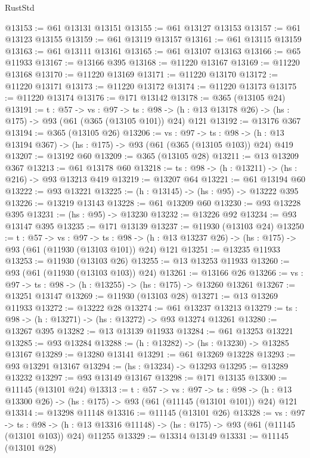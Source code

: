 \begin{lexlean}{RustStd}
\begin{coremodule}
@13153 := @61 @13131 @13151
@13155 := @61 @13127 @13153
@13157 := @61 @13123 @13155
@13159 := @61 @13119 @13157
@13161 := @61 @13115 @13159
@13163 := @61 @13111 @13161
@13165 := @61 @13107 @13163
@13166 := @65 @11933
@13167 := @13166 @395
@13168 := @11220 @13167
@13169 := @11220 @13168
@13170 := @11220 @13169
@13171 := @11220 @13170
@13172 := @11220 @13171
@13173 := @11220 @13172
@13174 := @11220 @13173
@13175 := @11220 @13174
@13176 := @171 @13142
@13178 := @365 (@13105 @24)
@13191 := {t : @57} ->
  {vs : @97} ->
  {ts : @98} -> (h : @13 @13178 @26) -> (hs : @175) -> @93 (@61 (@365 (@13105 @101)) @24) @121
@13192 := @13176 @367
@13194 := @365 (@13105 @26)
@13206 := {vs : @97} ->
  {ts : @98} -> (h : @13 @13194 @367) -> (hs : @175) -> @93 (@61 (@365 (@13105 @103)) @24) @419
@13207 := @13192 @60
@13209 := @365 (@13105 @28)
@13211 := @13 @13209 @367
@13213 := @61 @13178 @60
@13218 := {ts : @98} -> (h : @13211) -> (hs : @216) -> @93 @13213 @419
@13219 := @13207 @64
@13221 := @61 @13194 @60
@13222 := @93 @13221
@13225 := (h : @13145) -> (hs : @95) -> @13222 @395
@13226 := @13219 @13143
@13228 := @61 @13209 @60
@13230 := @93 @13228 @395
@13231 := (hs : @95) -> @13230
@13232 := @13226 @92
@13234 := @93 @13147 @395
@13235 := @171 @13139
@13237 := @11930 (@13103 @24)
@13250 := {t : @57} ->
  {vs : @97} ->
  {ts : @98} -> (h : @13 @13237 @26) -> (hs : @175) -> @93 (@61 (@11930 (@13103 @101)) @24) @121
@13251 := @13235 @11933
@13253 := @11930 (@13103 @26)
@13255 := @13 @13253 @11933
@13260 := @93 (@61 (@11930 (@13103 @103)) @24)
@13261 := @13166 @26
@13266 := {vs : @97} -> {ts : @98} -> (h : @13255) -> (hs : @175) -> @13260 @13261
@13267 := @13251 @13147
@13269 := @11930 (@13103 @28)
@13271 := @13 @13269 @11933
@13272 := @13222 @28
@13274 := @61 @13237 @13213
@13279 := {ts : @98} -> (h : @13271) -> (hs : @13272) -> @93 @13274 @13261
@13280 := @13267 @395
@13282 := @13 @13139 @11933
@13284 := @61 @13253 @13221
@13285 := @93 @13284
@13288 := (h : @13282) -> (hs : @13230) -> @13285 @13167
@13289 := @13280 @13141
@13291 := @61 @13269 @13228
@13293 := @93 @13291 @13167
@13294 := (hs : @13234) -> @13293
@13295 := @13289 @13232
@13297 := @93 @13149 @13167
@13298 := @171 @13135
@13300 := @11145 (@13101 @24)
@13313 := {t : @57} ->
  {vs : @97} ->
  {ts : @98} -> (h : @13 @13300 @26) -> (hs : @175) -> @93 (@61 (@11145 (@13101 @101)) @24) @121
@13314 := @13298 @11148
@13316 := @11145 (@13101 @26)
@13328 := {vs : @97} ->
  {ts : @98} ->
  (h : @13 @13316 @11148) -> (hs : @175) -> @93 (@61 (@11145 (@13101 @103)) @24) @11255
@13329 := @13314 @13149
@13331 := @11145 (@13101 @28)

\end{coremodule}
\end{lexlean}
